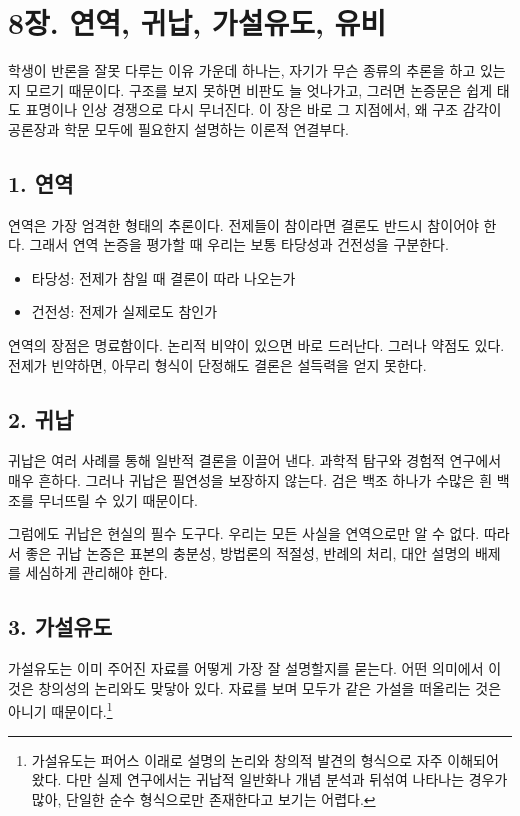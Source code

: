 \chapter{8장. 연역, 귀납, 가설유도, 유비}\label{8uxc7a5-uxc5f0uxc5ed-uxadc0uxb0a9-uxac00uxc124uxc720uxb3c4-uxc720uxbe44}

학생이 반론을 잘못 다루는 이유 가운데 하나는, 자기가 무슨 종류의 추론을 하고 있는지 모르기 때문이다. 구조를 보지 못하면 비판도 늘 엇나가고, 그러면 논증문은 쉽게 태도 표명이나 인상 경쟁으로 다시 무너진다. 이 장은 바로 그 지점에서, 왜 구조 감각이 공론장과 학문 모두에 필요한지 설명하는 이론적 연결부다.

\section{1. 연역}\label{1-uxc5f0uxc5ed}

연역은 가장 엄격한 형태의 추론이다. 전제들이 참이라면 결론도 반드시 참이어야 한다. 그래서 연역 논증을 평가할 때 우리는 보통 타당성과 건전성을 구분한다.

\begin{itemize}
\tightlist
\item
  타당성: 전제가 참일 때 결론이 따라 나오는가
\item
  건전성: 전제가 실제로도 참인가
\end{itemize}

연역의 장점은 명료함이다. 논리적 비약이 있으면 바로 드러난다. 그러나 약점도 있다. 전제가 빈약하면, 아무리 형식이 단정해도 결론은 설득력을 얻지 못한다.

\section{2. 귀납}\label{2-uxadc0uxb0a9}

귀납은 여러 사례를 통해 일반적 결론을 이끌어 낸다. 과학적 탐구와 경험적 연구에서 매우 흔하다. 그러나 귀납은 필연성을 보장하지 않는다. 검은 백조 하나가 수많은 흰 백조를 무너뜨릴 수 있기 때문이다.

그럼에도 귀납은 현실의 필수 도구다. 우리는 모든 사실을 연역으로만 알 수 없다. 따라서 좋은 귀납 논증은 표본의 충분성, 방법론의 적절성, 반례의 처리, 대안 설명의 배제를 세심하게 관리해야 한다.

\section{3. 가설유도}\label{3-uxac00uxc124uxc720uxb3c4}

가설유도는 이미 주어진 자료를 어떻게 가장 잘 설명할지를 묻는다. 어떤 의미에서 이것은 창의성의 논리와도 맞닿아 있다. 자료를 보며 모두가 같은 가설을 떠올리는 것은 아니기 때문이다.\footnote{가설유도는 퍼어스 이래로 설명의 논리와 창의적 발견의 형식으로 자주 이해되어 왔다. 다만 실제 연구에서는 귀납적 일반화나 개념 분석과 뒤섞여 나타나는 경우가 많아, 단일한 순수 형식으로만 존재한다고 보기는 어렵다.}

